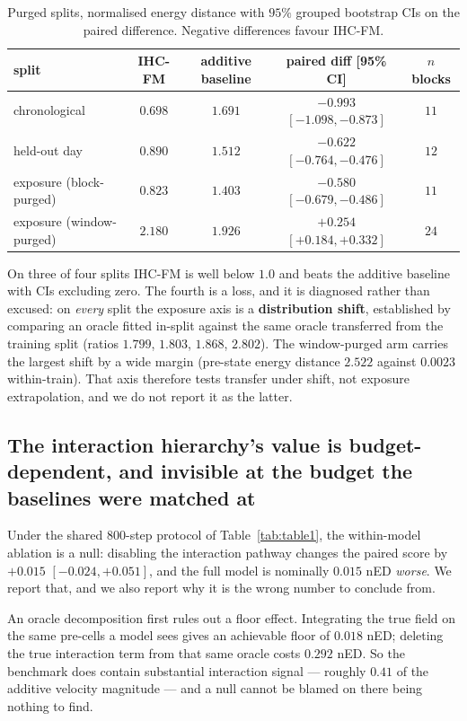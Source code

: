 \documentclass{article}
\newcommand{\tabonelabel}{tab:table1}
\begin{document}
\begin{table}[t]
\centering
\caption{Purged splits, normalised energy distance with $95\%$ grouped bootstrap CIs on the
paired difference. Negative differences favour IHC-FM.}
\label{tab:finance}
\begin{tabular}{lcccc}
\toprule
split & IHC-FM & additive baseline & paired diff [95\% CI] & $n$ blocks \\
\midrule
chronological     & $\mathbf{0.698}$ & $1.691$ & $-0.993$ $[-1.098, -0.873]$ & $11$ \\
held-out day      & $\mathbf{0.890}$ & $1.512$ & $-0.622$ $[-0.764, -0.476]$ & $12$ \\
exposure (block-purged)  & $\mathbf{0.823}$ & $1.403$ & $-0.580$ $[-0.679, -0.486]$ & $11$ \\
exposure (window-purged) & $2.180$ & $1.926$ & $+0.254$ $[+0.184, +0.332]$ & $24$ \\
\bottomrule
\end{tabular}
\end{table}

On three of four splits IHC-FM is well below $1.0$ and beats the additive baseline with CIs
excluding zero. The fourth is a loss, and it is diagnosed rather than excused: on \emph{every}
split the exposure axis is a \textbf{distribution shift}, established by comparing an oracle
fitted in-split against the same oracle transferred from the training split (ratios $1.799$,
$1.803$, $1.868$, $2.802$). The window-purged arm carries the largest shift by a wide margin
(pre-state energy distance $2.522$ against $0.0023$ within-train). That axis therefore tests
transfer under shift, not exposure extrapolation, and we do not report it as the latter.

\subsection{The interaction hierarchy's value is budget-dependent, and invisible at the
budget the baselines were matched at}
\label{sec:budget}

Under the shared $800$-step protocol of Table~\ref{\tabonelabel}, the within-model ablation
is a null: disabling the interaction pathway changes the paired score by $+0.015$
$[-0.024, +0.051]$, and the full model is nominally $0.015$ nED \emph{worse}. We report
that, and we also report why it is the wrong number to conclude from.

An oracle decomposition first rules out a floor effect. Integrating the true field on the
same pre-cells a model sees gives an achievable floor of $0.018$ nED; deleting the true
interaction term from that same oracle costs $0.292$ nED. So the benchmark does contain
substantial interaction signal --- roughly $0.41$ of the additive velocity magnitude --- and
a null cannot be blamed on there being nothing to find.
\end{document}
